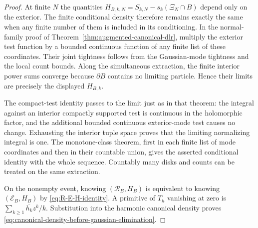 \documentclass[11pt,a4paper]{article}
\numberwithin{equation}{section}
\theoremstyle{definition}
\theoremstyle{remark}
\begin{document}
\begin{proof}
At finite $N$ the quantities
$H_{B,k,N}=S_{k,N}-s_k(\Xi_N\cap B)$ depend only on the exterior.
The finite conditional density therefore remains exactly the same
when any finite number of them is included in its conditioning.
In the normal-family proof of
Theorem~\ref{thm:augmented-canonical-dlr}, multiply the exterior test
function by a bounded continuous function of any finite list of these
coordinates. Their joint tightness follows from the Gaussian-mode
tightness and the local count bounds. Along the simultaneous extraction,
the finite interior power sums converge because $\partial B$ contains
no limiting particle. Hence their limits are precisely the displayed
$H_{B,k}$.

The compact-test identity passes to the limit just as in that theorem:
the integral against an interior compactly supported test is continuous
in the holomorphic factor, and the additional bounded continuous
exterior-mode test causes no change. Exhausting the interior tuple
space proves that the limiting normalizing integral is one. The
monotone-class theorem, first in each finite list of mode coordinates
and then in their countable union, gives the asserted conditional
identity with the whole sequence. Countably many disks and counts
can be treated on the same extraction.

On the nonempty event, knowing $(\mathcal R_B,H_B)$ is equivalent to
knowing $(\mathcal E_B,H_B)$ by \eqref{eq:R-E-H-identity}. A primitive
of $T_h$ vanishing at zero is
$\sum_{k\ge1}\overline{h_k}z^k/k$. Substitution into the harmonic
canonical density proves
\eqref{eq:canonical-density-before-gaussian-elimination}.
\end{proof}
\end{document}
